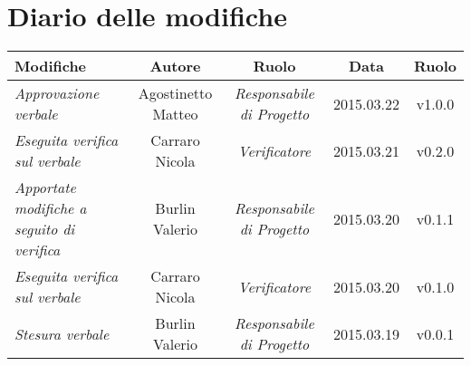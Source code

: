 \newpage
\section*{Diario delle modifiche}

\begin{table}[h]
\centering
\begin{tabular}{|p{}|c|c|c|c|}
	\toprule
		\textbf{Modifiche} & \textbf{Autore} & \textbf{Ruolo} & \textbf{Data} & \textbf{Ruolo} \\
	\midrule
	\midrule
		\textit{Approvazione verbale} & Agostinetto Matteo & \textit{Responsabile di Progetto} & 2015.03.22 & v1.0.0 \\									
	\midrule
		\textit{Eseguita verifica sul verbale} & Carraro Nicola & \textit{Verificatore} & 2015.03.21 & v0.2.0 \\
	\midrule
		\textit{Apportate modifiche a seguito di verifica} & Burlin Valerio & \textit{Responsabile di Progetto} & 2015.03.20 & v0.1.1 \\
	\midrule
		\textit{Eseguita verifica sul verbale} & Carraro Nicola & \textit{Verificatore} & 2015.03.20 & v0.1.0 \\ 
	\midrule
		\textit{Stesura verbale} & Burlin Valerio & \textit{Responsabile di Progetto} & 2015.03.19 & v0.0.1 \\
	\bottomrule
\end{tabular}	
\end{table}

\newpage